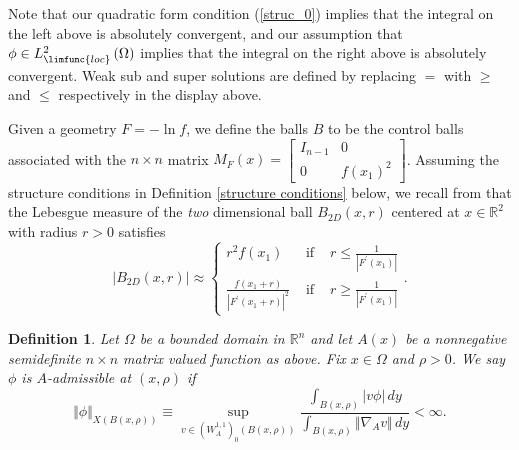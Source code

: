 \documentclass{amsart}
\theoremstyle{plain}
\newtheorem{definition}[theorem]{Definition}
\numberwithin{equation}{section}
\begin{document}
Note that our quadratic form condition (\ref{struc_0}) implies that the
integral on the left above is absolutely convergent, and our assumption that 
$\phi \in L_{\limfunc{loc}}^{2}\left( \Omega \right) $ implies that the
integral on the right above is absolutely convergent. Weak sub and super
solutions are defined by replacing $=$ with $\geq $ and $\leq $ respectively
in the display above.

Given a geometry $F=-\ln f$, we define the balls $B$ to be the control balls
associated with the $n\times n$ matrix $M_{F}\left( x\right) =\left[ 
\begin{array}{cc}
I_{n-1} & 0 \\ 
0 & f\left( x_{1}\right) ^{2}%
\end{array}%
\right] $. Assuming the structure conditions in Definition \ref{structure
	conditions} below, we recall from \cite{KoRiSaSh1} that the Lebesgue measure
of the \emph{two} dimensional ball $B_{2D}\left( x,r\right) $ centered at $%
x\in \mathbb{R}^{2}$ with radius $r>0$ satisfies%
\begin{equation}
\left\vert B_{2D}\left( x,r\right) \right\vert \approx \left\{ 
\begin{array}{ccc}
r^{2}f(x_{1}) & \text{ if } & r\leq \frac{1}{\left\vert F^{\prime }\left(
	x_{1}\right) \right\vert } \\ 
\frac{f\left( x_{1}+r\right) }{\left\vert F^{\prime }\left( x_{1}+r\right)
	\right\vert ^{2}} & \text{ if } & r\geq \frac{1}{\left\vert F^{\prime
	}\left( x_{1}\right) \right\vert }%
\end{array}%
\right. .  \label{measure}
\end{equation}

\begin{definition}
	\label{def A admiss new}Let $\Omega $ be a bounded domain in $\mathbb{R}^{n}$
	and let $A\left( x\right) $ be a nonnegative semidefinite $n\times n$ matrix
	valued function as above. Fix $x\in \Omega $ and $\rho >0$. We say $\phi $
	is $A$\emph{-admissible} at $\left( x,\rho \right) $ if 
	\begin{equation*}
	\Vert \phi \Vert _{X\left( B\left( x,\rho \right) \right) }\equiv \sup_{v\in
		\left( W_{A}^{1,1}\right) _{0}(B\left( x,\rho \right) )}\frac{\int_{B\left(
			x,\rho \right) }\left\vert v\phi \right\vert \,dy}{\int_{B\left( x,\rho
			\right) }\Vert \nabla _{A}v\Vert \,dy}<\infty .
	\end{equation*}
\end{definition}
\end{document}
